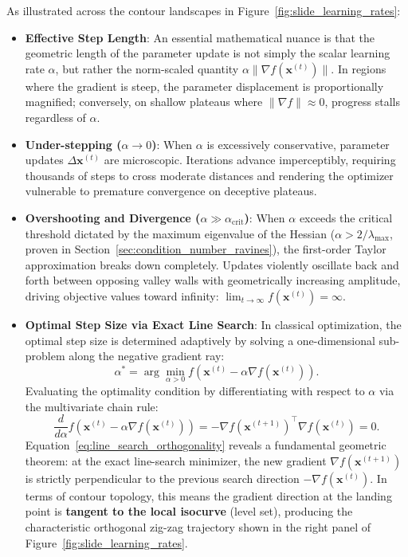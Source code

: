 As illustrated across the contour landscapes in Figure~\ref{fig:slide_learning_rates}:
\begin{itemize}
  \item \textbf{Effective Step Length}: An essential mathematical nuance is that the geometric length of the parameter update is not simply the scalar learning rate $\alpha$, but rather the norm-scaled quantity $\alpha \|\nabla f(\mathbf{x}^{(t)})\|$. In regions where the gradient is steep, the parameter displacement is proportionally magnified; conversely, on shallow plateaus where $\|\nabla f\| \approx 0$, progress stalls regardless of $\alpha$.
  \item \textbf{Under-stepping ($\alpha \to 0$)}: When $\alpha$ is excessively conservative, parameter updates $\Delta \mathbf{x}^{(t)}$ are microscopic. Iterations advance imperceptibly, requiring thousands of steps to cross moderate distances and rendering the optimizer vulnerable to premature convergence on deceptive plateaus.
  \item \textbf{Overshooting and Divergence ($\alpha \gg \alpha_{\text{crit}}$)}: When $\alpha$ exceeds the critical threshold dictated by the maximum eigenvalue of the Hessian ($\alpha > 2/\lambda_{\max}$, proven in Section~\ref{sec:condition_number_ravines}), the first-order Taylor approximation breaks down completely. Updates violently oscillate back and forth between opposing valley walls with geometrically increasing amplitude, driving objective values toward infinity: $\lim_{t \to \infty} f(\mathbf{x}^{(t)}) = \infty$.
  \item \textbf{Optimal Step Size via Exact Line Search}: In classical optimization, the optimal step size is determined adaptively by solving a one-dimensional sub-problem along the negative gradient ray:
    \begin{equation}
    \alpha^* = \arg\min_{\alpha > 0} f\left(\mathbf{x}^{(t)} - \alpha \nabla f(\mathbf{x}^{(t)})\right).
    \label{eq:exact_line_search}
    \end{equation}
    Evaluating the optimality condition by differentiating with respect to $\alpha$ via the multivariate chain rule:
    \begin{equation}
    \frac{d}{d\alpha} f\left(\mathbf{x}^{(t)} - \alpha \nabla f(\mathbf{x}^{(t)})\right) = -\nabla f\left(\mathbf{x}^{(t+1)}\right)^\top \nabla f\left(\mathbf{x}^{(t)}\right) = 0.
    \label{eq:line_search_orthogonality}
    \end{equation}
    Equation~\eqref{eq:line_search_orthogonality} reveals a fundamental geometric theorem: at the exact line-search minimizer, the new gradient $\nabla f(\mathbf{x}^{(t+1)})$ is strictly perpendicular to the previous search direction $-\nabla f(\mathbf{x}^{(t)})$. In terms of contour topology, this means the gradient direction at the landing point is \textbf{tangent to the local isocurve} (level set), producing the characteristic orthogonal zig-zag trajectory shown in the right panel of Figure~\ref{fig:slide_learning_rates}.
\end{itemize}

